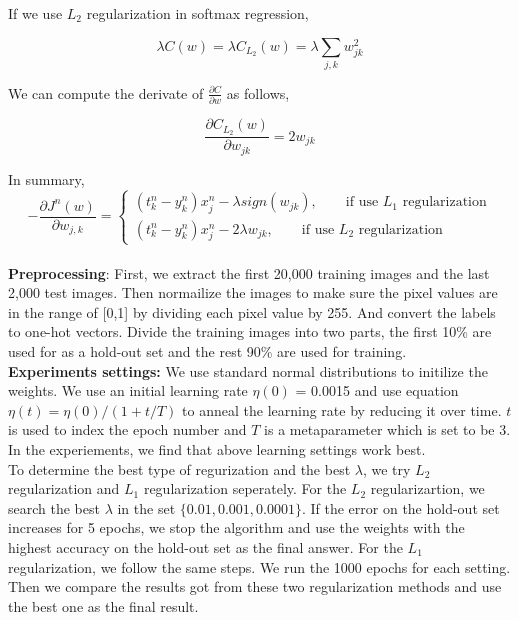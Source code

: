 \documentclass{article} %
\begin{document}
If we use $L_2$ regularization in softmax regression,

\begin{equation}
\lambda C(w) = \lambda C_{L_2}(w) =   \lambda \sum_{j,k}w_{jk}^2
\end{equation}

We can compute the derivate of $\frac{\partial C}{\partial w}$ as follows,

\begin{equation}
\frac{\partial C_{L_2}(w)}{\partial w_{jk}} = 2w_{jk}
\end{equation}

In summary, 
  \[
-\frac{\partial J^n(w)}{\partial w_{j,k}} =\left\{
\begin{array}{ll}
(t^n_k - y^n_k)x_j^n - \lambda sign(w_{jk}),\qquad \text{if use $L_1$ regularization} \\
(t^n_k - y^n_k)x_j^n - 2\lambda w_{jk}, \qquad \text{if use $L_2$ regularization}
\end{array}
\right.
\]
\\

\textbf{Preprocessing}: First, we extract the first 20,000 training images and the last 2,000 test images. Then normailize the images to make sure the pixel values are in the range of [0,1] by dividing each pixel value by 255. And convert the labels to one-hot vectors. Divide the training images into two parts, the first 10\% are used for as a hold-out set and the rest 90\% are used for training.
\\

\textbf{Experiments settings:} We use standard normal distributions to initilize the weights. We use an initial learning rate $\eta({0})$ = 0.0015 and use equation $\eta({t}) = \eta{(0)}/(1+t/T)$ to anneal the learning rate by reducing it over time. $t$ is used to index the epoch number and $T$ is a metaparameter which is set to be 3. In the
experiements, we find that above learning settings work best.
\\

To determine the best type of regurization and the best $\lambda$, we try $L_2$ regularization and $L_1$ regularization seperately. For the $L_2$ regularizartion, we search the best $\lambda$ in the set $\{0.01, 0.001, 0.0001\}$. If the error on the hold-out set increases for 5 epochs, we stop the algorithm and use the weights with the highest accuracy on the hold-out set as the final answer. For the $L_1$ regularization, we follow the same steps. We run the 1000 epochs for each setting. \textbf{}Then we compare the results got from these two regularization methods and use the best one as the final result.
\\
\end{document}

